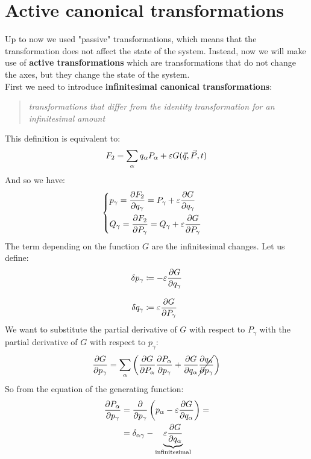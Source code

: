 \section{Active canonical transformations}
Up to now we used "passive" transformations, which means that the transformation does not affect the state of the system. Instead, now we will make use of \textbf{active transformations} which are transformations that do not change the axes, but they change the state of the system.\\
First we need to introduce \textbf{infinitesimal canonical transformations}:
\begin{quote}
    \textit{transformations that differ from the identity transformation for an infinitesimal amount}
\end{quote}
This definition is equivalent to:
\begin{equation}
    F_2 = \displaystyle\sum_{\alpha} q_{\alpha}P_{\alpha} + \varepsilon G(\vec{q},\vec{P},t)
\end{equation}
And so we have:
\begin{equation}
    \begin{cases}
        p_{\gamma} = \pdv{F_2}{q_{\gamma}} = P_{\gamma} + \varepsilon\pdv{ G}{q_{\gamma}}\\[10pt]
        Q_{\gamma} = \pdv{F_2}{P_{\gamma}} = Q_{\gamma} + \varepsilon\pdv{ G}{P_{\gamma}}
    \end{cases}
\end{equation}
The term depending on the function $G$ are the infinitesimal changes. Let us define:
\begin{equation}
    \begin{split}
        \delta p_{\gamma} &\defineeq -\varepsilon\pdv{ G}{q_{\gamma}}\\[8pt]
        \delta q_{\gamma} &\defineeq \varepsilon\pdv{ G}{P_{\gamma}}
    \end{split}
\end{equation}
We want to substitute the partial derivative of $G$ with respect to $P_{\gamma}$ with the partial derivative of $G$ with respect to $p_{\gamma}$:
\begin{equation}
    \pdv{G}{p_{\gamma}} = \bigsum_{\alpha} \brackets{\pdv{G}{P_{\alpha}}\pdv{P_{\alpha}}{p_{\gamma}} + \pdv{G}{q_{\alpha}}\cancel{\pdv{q_{\alpha}}{p_{\gamma}}}}
\end{equation}
So from the equation of the generating function:
\begin{equation}
    \begin{split}
        \pdv{P_{\alpha}}{p_{\gamma}} &= \pdv{}{p_{\gamma}}\brackets{p_{\alpha} - \varepsilon\pdv{ G}{q_{\alpha}}} = \\
        &= \delta_{\alpha \gamma} - \underbrace{\varepsilon\pdv{ G}{q_{\alpha}}}_{\text{infinitesimal}}
    \end{split}
\end{equation}
